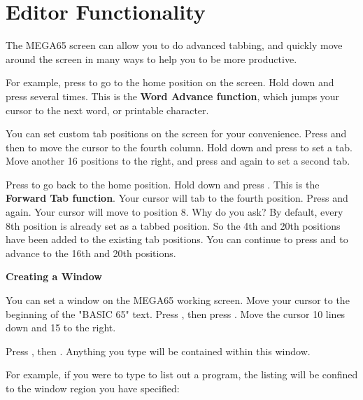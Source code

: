 \section{Editor Functionality}


The MEGA65 screen can allow you to do advanced tabbing, and quickly move around the screen in many ways to help you to be more productive.

For example, press  to go to the home position on the screen. Hold  down and press  several times. This is the \textbf{Word Advance function}, which jumps your cursor to the next word, or printable character.

You can set custom tab positions on the screen for your convenience. Press  and then \megakey{$\rightarrow$} to move the cursor to the fourth column. Hold down  and press  to set a tab. Move another 16 positions to the right, and press  and  again to set a second tab.

Press  to go back to the home position. Hold  down and press . This is the \textbf{Forward Tab function}. Your cursor will tab to the fourth position. Press  and  again. Your cursor will move to position 8. Why do you ask? By default, every 8th position is already set as a tabbed position. So the 4th and 20th positions have been added to the existing tab positions. You can continue to press  and  to advance to the 16th and 20th positions.

\textbf{Creating a Window}

You can set a window on the MEGA65 working screen. Move your cursor to the beginning of the "BASIC 65" text. Press , then press . Move the cursor 10 lines down and 15 to the right.

Press , then . Anything you type will be contained within this window.

For example, if you were to type  to list out a program, the listing will be confined to the window region you have specified:

